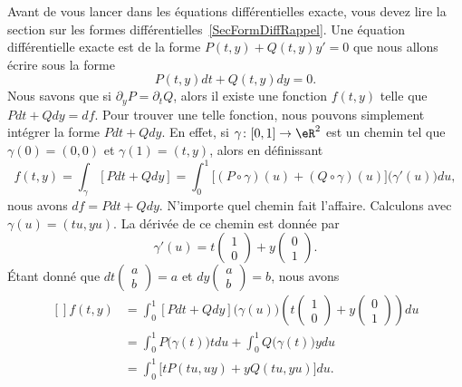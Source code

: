 Avant de vous lancer dans les équations différentielles exacte, vous devez lire la section sur les formes différentielles~\ref{SecFormDiffRappel}. Une équation différentielle exacte est de la forme \( P(t,y)+Q(t,y)y'=0\) que nous allons écrire sous la forme
\begin{equation}		\label{EqExacteDiff}
	P(t,y)dt+Q(t,y)dy=0.
\end{equation}
Nous savons que si \( \partial_yP=\partial_tQ\), alors il existe une fonction \( f(t,y)\) telle que \( Pdt+Qdy=df\). Pour trouver une telle fonction, nous pouvons simplement intégrer la forme \( Pdt+Qdy\). En effet, si \( \gamma\colon [0,1]\to \eR^2\) est un chemin tel que \( \gamma(0)=(0,0)\) et \( \gamma(1)=(t,y)\), alors en définissant
\begin{equation}
	f(t,y)=\int_{\gamma}[Pdt+Qdy]=\int_{0}^1\big[ (P\circ\gamma)(u)+(Q\circ\gamma)(u) \big]\big( \gamma'(u) \big)du,
\end{equation}
nous avons \( df=Pdt+Qdy\). N'importe quel chemin fait l'affaire. Calculons avec \( \gamma(u)=(tu,yu)\). La dérivée de ce chemin est donnée par
\begin{equation}
	\gamma'(u)=t\begin{pmatrix}
		1 \\
		0
	\end{pmatrix}+y\begin{pmatrix}
		0 \\
		1
	\end{pmatrix}.
\end{equation}
Étant donné que \( dt\begin{pmatrix}
	a \\
	b
\end{pmatrix}=a\) et \( dy\begin{pmatrix}
	a \\
	b
\end{pmatrix}=b\), nous avons
\begin{equation}
	\begin{aligned}[]
		f(t,y) & =\int_0^1[Pdt+Qdy]\big( \gamma(u) \big)\left( t\begin{pmatrix}
				                                                        1 \\
				                                                        0
			                                                        \end{pmatrix}+y\begin{pmatrix}
				                                                                       0 \\
				                                                                       1
			                                                                       \end{pmatrix} \right)du \\
		       & =\int_0^1P\big( \gamma(t) \big)tdu+\int_0^1Q\big( \gamma(t) \big)ydu                  \\
		       & =\int_0^1\big[ tP(tu,uy)+yQ(tu,yu) \big]du.
	\end{aligned}
\end{equation}
